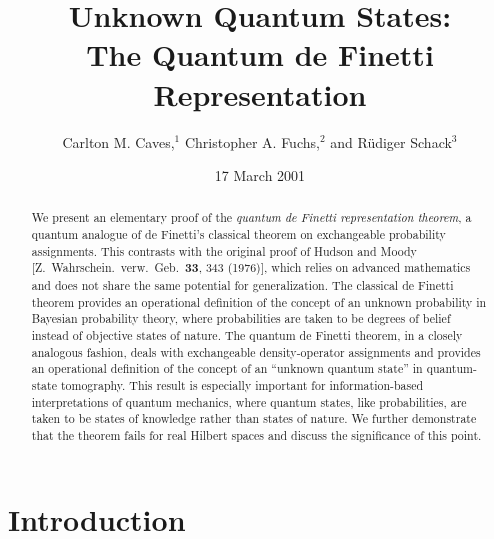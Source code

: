 \documentclass[12pt,aps,eqsecnum]{revtex4-1}
\begin{document}
\draft

\title{Unknown Quantum States: \\
The Quantum de Finetti Representation}

\author{Carlton M. Caves,$^1$ Christopher A. Fuchs,$^2$ and
R\"udiger Schack$^3$\medskip}

\address{$^1$Department of Physics and Astronomy, University of New Mexico,
\\
Albuquerque, New Mexico 87131--1156, USA
\\
$^2$Computing Science Research Center, Bell Labs, Lucent Technologies,
\\
Room 2C-420, 600--700 Mountain Avenue, Murray Hill, New Jersey 07974,
USA
\\
$^3$Department of Mathematics, Royal Holloway, University of London,
\\
Egham, Surrey TW20$\;$0EX, UK}

\date{17 March 2001}

\begin{abstract}
We present an elementary proof of the {\it quantum de Finetti
representation theorem}, a quantum analogue of de Finetti's
classical theorem on exchangeable probability assignments.  This
contrasts with the original proof of Hudson and Moody [Z.\
Wahrschein.\ verw.\ Geb.\ {\bf 33}, 343 (1976)], which relies on
advanced mathematics and does not share the same potential for
generalization.  The classical de Finetti theorem provides an
operational definition of the concept of an unknown probability in
Bayesian probability theory, where probabilities are taken to be
degrees of belief instead of objective states of nature.  The
quantum de Finetti theorem, in a closely analogous fashion, deals
with exchangeable density-operator assignments and provides an
operational definition of the concept of an ``unknown quantum
state'' in quantum-state tomography.  This result is especially
important for information-based interpretations of quantum
mechanics, where quantum states, like probabilities, are taken to
be states of knowledge rather than states of nature.  We further
demonstrate that the theorem fails for real Hilbert spaces and
discuss the significance of this point.
\end{abstract}

\maketitle

\section{Introduction} \label{sec-intro}
\end{document}
